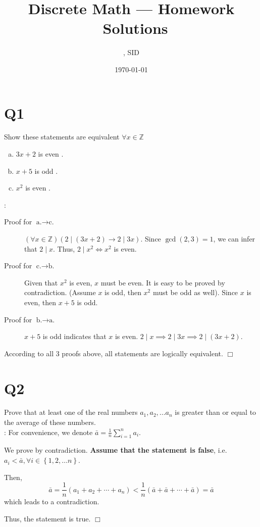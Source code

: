 \documentclass[11pt]{article}
\title{Discrete Math --- Homework \Homework \ Solutions}
\author{\Name, SID \SID}
\date{\today}
\def\endproofmark{$\Box$}
\newenvironment{proof}{{\bf Proof}:}{\endproofmark\smallskip}
\begin{document}
\maketitle


\section*{Q1}
Show these statements are equivalent 
$\forall  x \in \mathbb{Z}$
\begin{enumerate}[a.]
    
    \item $3x+2$ is even .
    \item $x+5$ is odd .
    \item $x^{2}$ is even .
\end{enumerate}
\begin{proof}
    \begin{description}
        
        \item[Proof for $\text{a.}\to \text{c.}$]
        $(\forall x\in \mathbb{Z}) (2 \mid (3x+2)
        \to 2\mid 3x)$. 
        Since $\operatorname{gcd}(2,3)=1$, we can infer that 
        $2\mid x$. Thus, $2\mid x^{2}\iff x^{2} $ is even.
        
        \item [Proof for $\text{c.} \to \text{b.}$]
        Given that $x^{2}$ is even, $x$ must be even.
        It is easy to be proved by contradiction. 
        (Assume $x$ is odd, then $x^{2}$ must be odd as well).
        Since $x $ is even, then $x+5$ is odd.
        
        \item [Proof for $\text{b.}\to \text{a.}$]
        $x+5$ is odd indicates that $x $ is even. 
        $2\mid x \implies 2\mid 3x \implies 2\mid (3x+2)$.
    \end{description}
    According to all 3 proofs above, all statements are logically equivalent.
\end{proof}


\section*{Q2}
Prove that at least one of the real numbers $a_1,a_2, \ldots a_n$ is
greater than or equal to the average of these numbers.\\
\begin{proof}
    For convenience, we denote 
    $\bar{a}=\frac{1}{n}\sum_{i=1}^{n}a_i$.

    We prove by contradiction.
    \textbf{Assume that the statement is false}, i.e. 
    $a_i < \bar{a}, \forall i \in \left\{ 1,2, \ldots n \right\}$.
    
    Then,
    \begin{equation*}
      \bar{a}=\frac{1}{n}(a_1+a_2+ \cdots +a_n)<
      \frac{1}{n}(\bar{a}+\bar{a}+ \cdots +\bar{a})=\bar{a}
    \end{equation*}
    which leads to a contradiction.

    Thus, the statement is true.
\end{proof}
\end{document}
